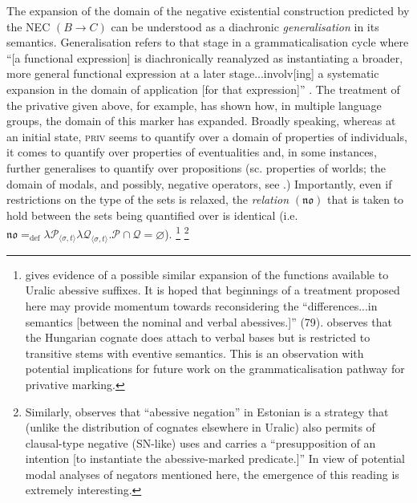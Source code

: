 \documentclass[output=paper,draft,draftmode,colorlinks,citecolor=brown]{langscibook}
\begin{document}
The expansion of the domain of the negative existential construction
predicted by the NEC $(B\to C)$ can be understood as a diachronic
\textit{generalisation} in its semantics. Generalisation refers to that
stage in a grammaticalisation cycle where ``[a functional expression] is
diachronically reanalyzed as instantiating a broader, more general
functional expression at a later stage...involv[ing] a systematic expansion
in the domain of application [for that expression]'' \citep[187]{Deo2015}.
The treatment of the privative given above, for example, has shown how, in
multiple language groups, the domain of this marker has expanded. Broadly
speaking, whereas at an initial state, \textsc{priv} seems to quantify over
a domain of properties of individuals\iffalse$\langle\langle e,t\rangle
,\langle\langle e,t\rangle,t\rangle\rangle$\fi, it comes to quantify over
properties of eventualities \iffalse$\langle\langle \mathcal\varepsilon
,t\rangle ,\langle\langle \varepsilon,t\rangle,t\rangle\rangle$\fi and, in
some instances, further generalises to quantify over propositions  (sc.
properties of worlds; the domain of modals, and possibly, negative
operators, see \citealt[34ff]{HornWansing2017}.) Importantly, even if
restrictions on the type of the sets is relaxed, the \textit{relation}
$({\mathfrak{n\!o}})$ that is taken to hold between the sets
being quantified over is identical
(i.e.~$\mathfrak{no}=_{\text{def}}\lambda \mathcal
P_{\langle\sigma,t\rangle}\lambda \mathcal
Q_{\langle\sigma,t\rangle}.\mathcal P\cap \mathcal Q=\varnothing$).%
%
\footnote{\citet{Hamari2011-austr} gives evidence of a possible similar expansion of the functions available to Uralic abessive suffixes. It is hoped that beginnings of a treatment proposed here may provide momentum towards reconsidering the ``differences...in semantics [between the nominal and verbal abessives.]'' (79). \citet[609]{Kiefer2015} observes that the Hungarian cognate does attach to verbal bases but is restricted to transitive stems with eventive semantics. This is an observation with potential implications for future work on the grammaticalisation pathway for privative marking.}
\footnote{\label{fn:austr-Tamm}Similarly, \citet[416]{Tamm2015} observes that ``abessive negation'' in Estonian is a strategy that (unlike the distribution of cognates elsewhere in Uralic) also permits of clausal-type negative (SN-like) uses and carries a ``presupposition of an intention [to instantiate the abessive-marked predicate.]'' In view of potential modal analyses of negators mentioned here, the emergence of this reading is extremely interesting.}
\end{document}
